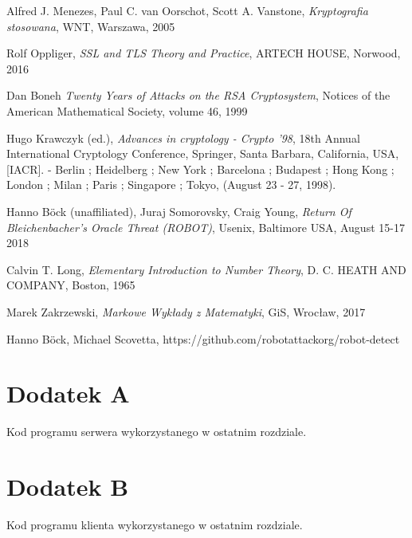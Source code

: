 \documentclass[12pt,twoside,a4]{mwbk}
\theoremstyle{definition}
\begin{document}
\begin{thebibliography}{9}



 Alfred J. Menezes, Paul C. van Oorschot, Scott A. Vanstone, \textit{Kryptografia stosowana}, WNT, Warszawa, 2005

 Rolf Oppliger, \textit{SSL and TLS Theory and Practice}, ARTECH HOUSE, Norwood, 2016

 Dan Boneh \textit{Twenty Years of Attacks on the RSA Cryptosystem}, Notices of the American Mathematical Society, volume 46, 1999

 Hugo Krawczyk (ed.), \textit{Advances in cryptology - Crypto '98}, 18th Annual International Cryptology Conference, Springer, Santa Barbara, California, USA, [IACR]. - Berlin ; Heidelberg ; New York ; Barcelona ; Budapest ; Hong Kong ;
London ; Milan ; Paris ; Singapore ; Tokyo,
(August 23 - 27, 1998).

 Hanno Böck (unaffiliated), Juraj Somorovsky, Craig Young, \textit{Return Of Bleichenbacher's Oracle Threat (ROBOT)}, Usenix, Baltimore USA, August 15-17 2018

 Calvin T. Long, \textit{Elementary Introduction to Number Theory}, D. C. HEATH AND COMPANY, Boston, 1965

 Marek Zakrzewski, \textit{Markowe Wykłady z Matematyki}, GiS, Wrocław, 2017

 Hanno Böck, Michael Scovetta, https://github.com/robotattackorg/robot-detect

\end{thebibliography}


\chapter*{Dodatek A}
Kod programu serwera wykorzystanego w ostatnim rozdziale.


\chapter*{Dodatek B}
Kod programu klienta wykorzystanego w ostatnim rozdziale.

\end{document}
